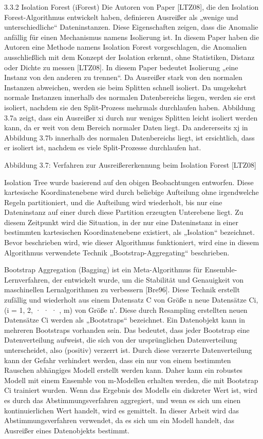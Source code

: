 3.3.2 Isolation Forest (iForest)
Die Autoren von Paper [LTZ08], die den Isolation Forest-Algorithmus entwickelt haben, definieren Ausreißer als „wenige und unterschiedliche“ Dateninstanzen. Diese Eigenschaften zeigen, dass die Anomalie anfällig für einen Mechanismus namens Isolierung ist. In diesem Paper haben die Autoren eine Methode namens Isolation Forest vorgeschlagen, die Anomalien ausschließlich mit dem Konzept der Isolation erkennt, ohne Statistiken, Distanz oder Dichte zu messen [LTZ08]. In diesem Paper bedeutet Isolierung „eine Instanz von den anderen zu trennen“. Da Ausreißer stark von den normalen Instanzen abweichen, werden sie beim Splitten schnell isoliert. Da umgekehrt normale Instanzen innerhalb des normalen Datenbereichs liegen, werden sie erst isoliert, nachdem sie den Split-Prozess mehrmals durchlaufen haben. Abbildung 3.7a zeigt, dass ein Ausreißer xi durch nur weniges Splitten leicht isoliert werden kann, da er weit von dem Bereich normaler Daten liegt. Da andererseits xj in Abbildung 3.7b innerhalb des normalen Datenbereichs liegt, ist ersichtlich, dass er isoliert ist, nachdem es viele Split-Prozesse durchlaufen hat.

Abbildung 3.7: Verfahren zur Ausreißererkennung beim Isolation Forest [LTZ08]

Isolation Tree wurde basierend auf den obigen Beobachtungen entworfen. Diese kartesische Koordinatenebene wird durch beliebige Aufteilung ohne irgendwelche Regeln partitioniert, und die Aufteilung wird wiederholt, bis nur eine Dateninstanz auf einer durch diese Partition erzeugten Unterebene liegt. Zu diesem Zeitpunkt wird die Situation, in der nur eine Dateninstanz in einer bestimmten kartesischen Koordinatenebene existiert, als „Isolation“ bezeichnet. Bevor beschrieben wird, wie dieser Algorithmus funktioniert, wird eine in diesem Algorithmus verwendete Technik „Bootstrap-Aggregating“ beschrieben.

Bootstrap Aggregation (Bagging) ist ein Meta-Algorithmus für Ensemble-Lernverfahren, der entwickelt wurde, um die Stabilität und Genauigkeit von maschinellen Lernalgorithmen zu verbessern [Bre96]. Diese Technik erstellt zufällig und wiederholt aus einem Datensatz C von Größe n neue Datensätze Ci, (i = 1, 2, · · · , m) von Größe n′. Diese durch Resampling erstellten neuen Datensätze Ci werden als „Bootstraps“ bezeichnet. Ein Datenobjekt kann in mehreren Bootstraps vorhanden sein. Das bedeutet, dass jeder Bootstrap eine Datenverteilung aufweist, die sich von der ursprünglichen Datenverteilung unterscheidet, also (positiv) verzerrt ist. Durch diese verzerrte Datenverteilung kann der Gefahr verhindert werden, dass ein nur von einem bestimmten Rauschen abhängiges Modell erstellt werden kann. Daher kann ein robustes Modell mit einem Ensemble von m-Modellen erhalten werden, die mit Bootstrap Ci trainiert wurden. Wenn das Ergebnis des Modells ein diskreter Wert ist, wird es durch das Abstimmungsverfahren aggregiert, und wenn es sich um einen kontinuierlichen Wert handelt, wird es gemittelt. In dieser Arbeit wird das Abstimmungsverfahren verwendet, da es sich um ein Modell handelt, das Ausreißer eines Datenobjekts
bestimmt.

